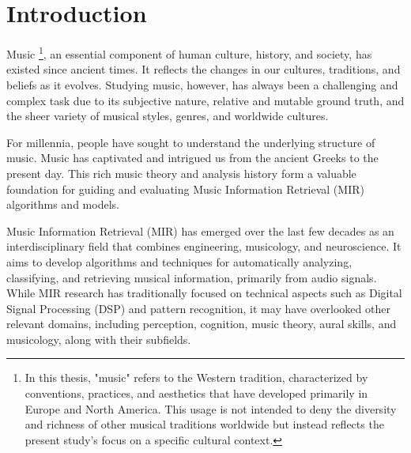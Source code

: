 \chapter{Introduction}

Music \footnote{In this thesis, "music" refers to the Western tradition, characterized by conventions, practices, and aesthetics that have developed primarily in Europe and North America. This usage is not intended to deny the diversity and richness of other musical traditions worldwide but instead reflects the present study's focus on a specific cultural context.}, an essential component of human culture, history, and society, has existed since ancient times. It reflects the changes in our cultures, traditions, and beliefs as it evolves. Studying music, however, has always been a challenging and complex task due to its subjective nature, relative and mutable ground truth, and the sheer variety of musical styles, genres, and worldwide cultures.

For millennia, people have sought to understand the underlying structure of music. Music has captivated and intrigued us from the ancient Greeks to the present day. This rich music theory and analysis history form a valuable foundation for guiding and evaluating Music Information Retrieval (MIR) algorithms and models.

Music Information Retrieval (MIR) has emerged over the last few decades as an interdisciplinary field that combines engineering, musicology, and neuroscience. It aims to develop algorithms and techniques for automatically analyzing, classifying, and retrieving musical information, primarily from audio signals. While MIR research has traditionally focused on technical aspects such as Digital Signal Processing (DSP) and pattern recognition, it may have overlooked other relevant domains, including perception, cognition, music theory, aural skills, and musicology, along with their subfields.